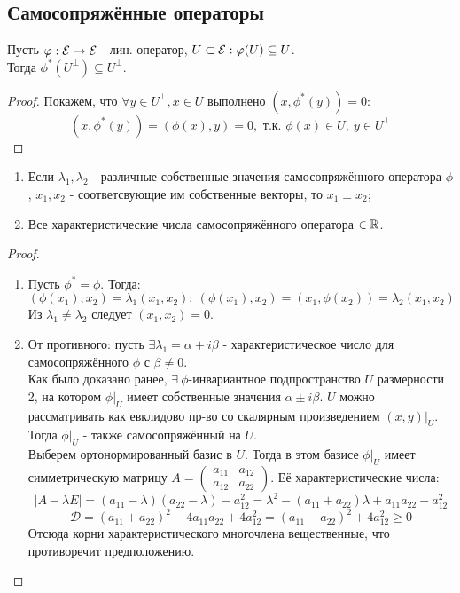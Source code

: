 \subsection{Самосопряжённые операторы}
\begin{lemma}
    Пусть $\varphi: \mathcal{E} \rightarrow \mathcal{E}$ - лин. оператор, $U \subset \mathcal{E}: \varphi(U) \subseteq U$.\\
    Тогда $\phi^*(U^\perp) \subseteq U^\perp$.
\end{lemma}
\begin{proof}
    Покажем, что $\forall y \in U^\perp, x \in U$ выполнено $(x, \phi^*(y)) = 0$:
    $$(x, \phi^*(y)) = (\phi(x), y) = 0, \text{ т.к. } \phi(x) \in U, \ y \in U^\perp$$
\end{proof}
\begin{subtheorem}
    \begin{enumerate}
        \item Если $\lambda_1, \lambda_2$ - различные собственные значения самосопряжённого оператора $\phi$, $x_1, x_2$ - соответсвующие им собственные векторы, то $x_1 \perp x_2$;
        \item Все характеристические числа самосопряжённого оператора $\in \mathbb{R}$.
    \end{enumerate}
\end{subtheorem}
\begin{proof} \tab
    \begin{enumerate}
        \item Пусть $\phi^* = \phi$. Тогда:
        $$(\phi(x_1), x_2) = \lambda_1(x_1, x_2); \ (\phi(x_1), x_2) = (x_1, \phi(x_2)) = \lambda_2(x_1, x_2)$$
        Из $\lambda_1 \neq \lambda_2$ следует $(x_1, x_2) = 0$. 
        \item От противного: пусть $\exists \lambda_1 = \alpha + i\beta$ - характеристическое число для самосопряжённого $\phi$ с $\beta \neq 0$.\\
        Как было доказано ранее, $\exists \ \phi$-инвариантное подпространство $U$ размерности 2, на котором $\phi|_U$ имеет собственные значения $\alpha \pm i\beta$.
        $U$ можно рассматривать как евклидово пр-во со скалярным произведением $(x, y)|_U$. Тогда $\phi|_U$ - также самосопряжённый на $U$.\\
        Выберем ортонормированный базис в $U$. Тогда в этом базисе $\phi|_U$ имеет симметрическую матрицу $A = \begin{pmatrix} a_{11}&a_{12} \\ a_{12}&a_{22} \end{pmatrix}$. Её характеристические числа:
        $$|A - \lambda E| = (a_{11} - \lambda)(a_{22} - \lambda) - a_{12}^2 = \lambda^2 - (a_{11} + a_{22})\lambda + a_{11}a_{22} - a_{12}^2$$
        $$\mathcal{D} = (a_{11} + a_{22})^2 - 4a_{11}a_{22} + 4a_{12}^2 = (a_{11} - a_{22})^2 + 4a_{12}^2 \geqslant 0$$
        Отсюда корни характеристического многочлена вещественные, что противоречит предположению.
    \end{enumerate}
\end{proof}
